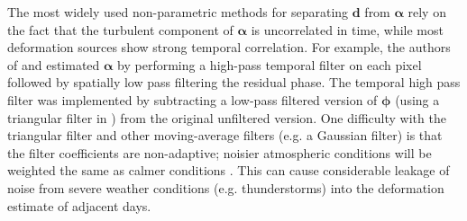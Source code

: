 The most widely used non-parametric methods for separating $ \bm{d} $ from $ \bm{\alpha} $ rely on the fact that the turbulent component of $\bm{\alpha}$ is uncorrelated in time, while most deformation sources show strong temporal correlation.
For example, the authors of \cite{Ferretti2000NonlinearSubsidenceRate} and \cite{Berardino2002NewAlgorithmSurface} estimated $\bm{\alpha}$ by performing a high-pass temporal filter on each pixel followed by spatially low pass filtering the residual phase.
The temporal high pass filter was implemented by subtracting a low-pass filtered version of $ \bm{\phi} $ (using a triangular filter in \cite{Ferretti2000NonlinearSubsidenceRate}) from the original unfiltered version.
One difficulty with the triangular filter and other moving-average filters (e.g. a Gaussian filter) is that the filter coefficients are non-adaptive; noisier atmospheric conditions will be weighted the same as calmer conditions \citep{Liu2012SatelliteRadarInterferometry}.
This can cause considerable leakage of noise from severe weather conditions (e.g. thunderstorms) into the deformation estimate of adjacent days.



